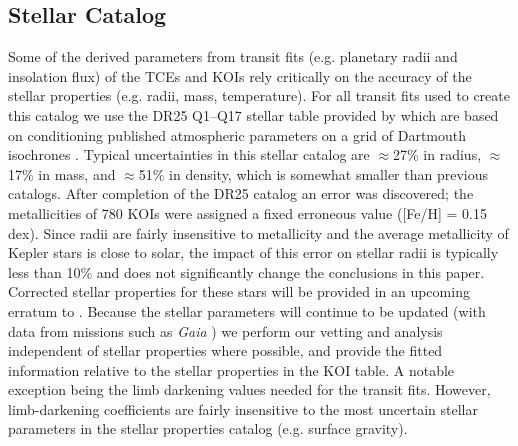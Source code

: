 \subsection{Stellar Catalog}
\label{s:stars}
Some of the derived parameters from transit fits (e.g. planetary radii and insolation flux) of the TCEs and KOIs rely critically on the accuracy of the stellar properties (e.g. radii, mass, temperature).   For all transit fits used to create this catalog we use the DR25 Q1--Q17 stellar table provided by \citet{Mathur2017ApJS} which are based on conditioning published atmospheric parameters on a grid of Dartmouth isochrones \citep{Dotter2008}.  Typical uncertainties in this stellar catalog are $\approx$27\% in radius, $\approx$17\% in mass, and $\approx$51\% in density, which is somewhat smaller than previous catalogs. 
{\color{blue}After completion of the DR25 catalog an error was discovered; the metallicities of 780 KOIs were assigned a fixed erroneous value ([Fe/H] = 0.15 dex). Since radii are fairly insensitive to metallicity and the average metallicity of Kepler stars is close to solar, the impact of this error on stellar radii is typically less than 10\% and does not significantly change the conclusions in this paper. Corrected stellar properties for these stars will be provided in an upcoming erratum to \citet{Mathur2017ApJS}. Because the stellar parameters will continue to be updated (with data from missions such as \emph{Gaia} \citep{gaia1,gaia2}) we perform our vetting and analysis independent of stellar properties where possible, and provide the fitted information relative to the stellar properties in the KOI table.  A notable exception being the limb darkening values needed for the transit fits. However, limb-darkening coefficients are fairly insensitive to the most uncertain stellar parameters in the stellar properties catalog (e.g. surface gravity).}